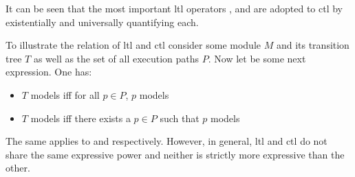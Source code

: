 It can be seen that the most important \gls{ltl} operators ,  and  are adopted to \gls{ctl} by existentially and universally quantifying each.

\begin{example}
    To illustrate the relation of \gls{ltl} and \gls{ctl} consider some module $ M $ and its transition tree $ T $ as well as the set of all execution paths $ P $.
    Now let  be some next expression.
    One has:
    \begin{itemize}
        \item $ T $ models  iff for all $ p \in P $, $ p $ models 
        \item $ T $ models  iff there exists a $ p \in P $ such that $ p $ models 
    \end{itemize}
    The same applies to  and  respectively.
    However, in general, \gls{ltl} and \gls{ctl} do not share the same expressive power and neither is strictly more expressive than the other.
\end{example}

